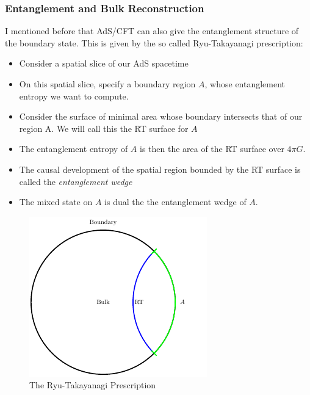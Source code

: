 \documentclass[8pt,aspectratio=169]{beamer}
\begin{document}
\begin{frame}
\frametitle{Entanglement and Bulk Reconstruction}

I mentioned before that AdS/CFT can also give the entanglement structure of the boundary state. This is given by the so called Ryu-Takayanagi prescription: 

\begin{minipage}[t]{0.55\linewidth}

\begin{itemize}

\item Consider a spatial slice of our AdS spacetime

\item On this spatial slice, specify a boundary region $A$, whose entanglement entropy we want to compute. 

\item Consider the surface of minimal area whose boundary intersects that of our region A. We will call this the RT surface for $A$

\item The entanglement entropy of $A$ is then the area of the RT surface over $4\pi G$.

\item The causal development of the spatial region bounded by the RT surface is called the \textit{entanglement wedge}

\item The mixed state on $A$ is dual the the entanglement wedge of $A$.

\end{itemize}

\end{minipage}\hfill
%
\begin{minipage}[t]{0.44\linewidth}

\begin{figure}
    \begin{center}
    
        \includegraphics[scale=1]{RT}    
    
    \end{center}
    \caption{The Ryu-Takayanagi Prescription}
    \label{fig:WDW}
\end{figure}

\end{minipage}

\end{frame}
\end{document}
